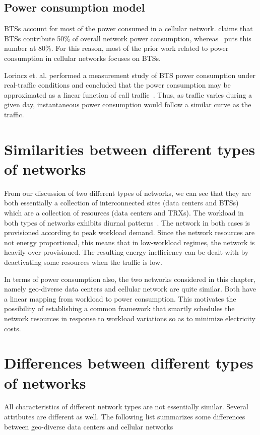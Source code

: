 \subsection{Power consumption model} %
BTSs account for most of the power consumed in a cellular network. \cite{Louhi:2007:BTSPower:INTELEC} claims that BTSs contribute 50\% of overall network power consumption, whereas~\cite{Oh:Comm:2011} puts this number at 80\%. For this reason, most of the prior work related to power consumption in cellular networks focuses on BTSs. 

Lorincz et. al. performed a measurement study of BTS power consumption under real-traffic conditions and concluded that the power consumption may be approximated as a linear function of call traffic~\cite{Lorincz:BTS-Measure:Sensors:2012}. Thus, as traffic varies during a given day, instantaneous power consumption would follow a similar curve as the traffic.

\section{Similarities between different types of networks} %
From our discussion of two different types of networks, we can see that they are both essentially a collection of interconnected sites (data centers and BTSs) which are a collection of resources (data centers and TRXs). The workload in both types of networks exhibits diurnal patterns~\cite{10.1109/MC.2007.443,Peng:2011:TPS:2030613.2030628}. The network in both cases is provisioned according to peak workload demand. Since the network resources are not energy proportional, this means that in low-workload regimes, the network is heavily over-provisioned. The resulting energy inefficiency can be dealt with by deactivating some resources when the traffic is low.

In terms of power consumption also, the two networks considered in this chapter, namely geo-diverse data centers and cellular network are quite similar. Both have a linear mapping from workload to power consumption. This motivates the possibility of establishing a common framework that smartly schedules the network resources in response to workload variations so as to minimize electricity costs.

\section{Differences between different types of networks}
All characteristics of different network types are not essentially similar. Several attributes are different as well. The following list summarizes some differences between geo-diverse data centers and cellular networks

